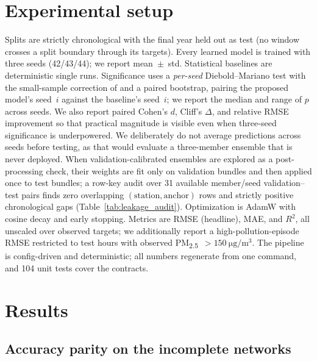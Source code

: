 \documentclass[review,3p,times]{elsarticle}
\newcommand{\ugm}{\si{\micro\gram\per\cubic\metre}}
\newcommand{\pmf}{PM\textsubscript{2.5}}
\begin{document}
\section{Experimental setup}
\label{sec:setup}

Splits are strictly chronological with the final year held out as test
(no window crosses a split boundary through its targets). Every learned model is
trained with three seeds (42/43/44); we report mean~$\pm$~std. Statistical
baselines are deterministic single runs. Significance uses a \emph{per-seed}
Diebold--Mariano test \citep{diebold1995comparing} with the small-sample
correction of \citet{harvey1997testing} and a paired bootstrap, pairing the
proposed model's seed~$i$ against the baseline's seed~$i$; we report the median
and range of $p$ across seeds. We also report paired Cohen's $d$, Cliff's
$\Delta$, and relative RMSE improvement so that practical magnitude is visible
even when three-seed significance is underpowered. We deliberately do not
average predictions across seeds before testing, as that would evaluate a
three-member ensemble that is never deployed. When validation-calibrated
ensembles are explored as a post-processing check, their weights are fit only on
validation bundles and then applied once to test bundles; a row-key audit over
31 available member/seed validation--test pairs finds zero overlapping
$(\text{station},\text{anchor})$ rows and strictly positive chronological gaps
(Table~\ref{tab:leakage_audit}). Optimization is AdamW
\citep{loshchilov2019adamw} with cosine
decay and early stopping. Metrics are RMSE (headline), MAE, and $R^2$, all
unscaled over observed targets; we additionally report a high-pollution-episode
RMSE restricted to test hours with observed \pmf{}~$>\SI{150}{\ugm}$. The
pipeline is config-driven and deterministic; all numbers regenerate from one
command, and 104 unit tests cover the contracts.



\section{Results}
\label{sec:results}

\subsection{Accuracy parity on the incomplete networks}
\label{sec:parity}
\end{document}
